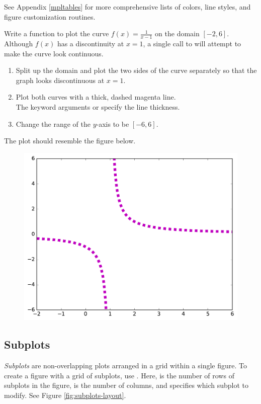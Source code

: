 See Appendix \ref{mpltables} for more comprehensive lists of colors, line styles, and figure customization routines.

\begin{problem} %
Write a function to plot the curve $f(x) = \frac{1}{x-1}$ on the domain $[-2,6]$.
Although $f(x)$ has a discontinuity at $x=1$, a single call to  will attempt to make the curve look continuous.
\begin{enumerate}
\item Split up the domain and plot the two sides of the curve separately so that the graph looks discontinuous at $x=1$.
\item Plot both curves with a thick, dashed magenta line.\\
The keyword arguments  or  specify the line thickness.
\item Change the range of the $y$-axis to be $[-6, 6]$.
\end{enumerate}
The plot should resemble the figure below.

\begin{figure}[H] %
\includegraphics[width=.5\textwidth]{figures/discontinuousProblem.pdf}
\end{figure}
\end{problem}

\subsection*{Subplots} %

\emph{Subplots} are non-overlapping plots arranged in a grid within a single figure.
To create a figure with a grid of subplots, use .
Here,  is the number of rows of subplots in the figure,  is the number of columns, and  specifies which subplot to modify.
See Figure \ref{fig:subplots-layout}.

